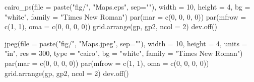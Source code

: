 \documentclass[
  letterpaper,
  DIV=11,
  numbers=noendperiod]{scrreprt}
\newenvironment{Shaded}{\begin{snugshade}}{\end{snugshade}}
\newcommand{\AttributeTok}[1]{\textcolor[rgb]{0.40,0.45,0.13}{#1}}
\newcommand{\DecValTok}[1]{\textcolor[rgb]{0.68,0.00,0.00}{#1}}
\newcommand{\FunctionTok}[1]{\textcolor[rgb]{0.28,0.35,0.67}{#1}}
\newcommand{\NormalTok}[1]{\textcolor[rgb]{0.00,0.23,0.31}{#1}}
\newcommand{\StringTok}[1]{\textcolor[rgb]{0.13,0.47,0.30}{#1}}
\begin{document}
\begin{Shaded}
\begin{Highlighting}[]
\FunctionTok{cairo\_ps}\NormalTok{(}\AttributeTok{file =} \FunctionTok{paste}\NormalTok{(}\StringTok{"fig/"}\NormalTok{, }\StringTok{"Maps.eps"}\NormalTok{, }\AttributeTok{sep=}\StringTok{""}\NormalTok{), }\AttributeTok{width =} \DecValTok{10}\NormalTok{, }\AttributeTok{height =} \DecValTok{4}\NormalTok{, }
          \AttributeTok{bg =} \StringTok{"white"}\NormalTok{, }\AttributeTok{family =} \StringTok{"Times New Roman"}\NormalTok{)}
\FunctionTok{par}\NormalTok{(}\AttributeTok{mar =} \FunctionTok{c}\NormalTok{(}\DecValTok{0}\NormalTok{, }\DecValTok{0}\NormalTok{, }\DecValTok{0}\NormalTok{, }\DecValTok{0}\NormalTok{))}
\FunctionTok{par}\NormalTok{(}\AttributeTok{mfrow =} \FunctionTok{c}\NormalTok{(}\DecValTok{1}\NormalTok{, }\DecValTok{1}\NormalTok{), }\AttributeTok{oma =} \FunctionTok{c}\NormalTok{(}\DecValTok{0}\NormalTok{, }\DecValTok{0}\NormalTok{, }\DecValTok{0}\NormalTok{, }\DecValTok{0}\NormalTok{))}
\FunctionTok{grid.arrange}\NormalTok{(gp, gp2, }\AttributeTok{ncol =} \DecValTok{2}\NormalTok{)}
\FunctionTok{dev.off}\NormalTok{()}

\FunctionTok{jpeg}\NormalTok{(}\AttributeTok{file =} \FunctionTok{paste}\NormalTok{(}\StringTok{"fig/"}\NormalTok{, }\StringTok{"Maps.jpeg"}\NormalTok{, }\AttributeTok{sep=}\StringTok{""}\NormalTok{), }\AttributeTok{width =} \DecValTok{10}\NormalTok{, }\AttributeTok{height =} \DecValTok{4}\NormalTok{, }
    \AttributeTok{units =} \StringTok{"in"}\NormalTok{, }\AttributeTok{res =} \DecValTok{300}\NormalTok{, }\AttributeTok{type =} \StringTok{"cairo"}\NormalTok{,}
          \AttributeTok{bg =} \StringTok{"white"}\NormalTok{, }\AttributeTok{family =} \StringTok{"Times New Roman"}\NormalTok{)}
\FunctionTok{par}\NormalTok{(}\AttributeTok{mar =} \FunctionTok{c}\NormalTok{(}\DecValTok{0}\NormalTok{, }\DecValTok{0}\NormalTok{, }\DecValTok{0}\NormalTok{, }\DecValTok{0}\NormalTok{))}
\FunctionTok{par}\NormalTok{(}\AttributeTok{mfrow =} \FunctionTok{c}\NormalTok{(}\DecValTok{1}\NormalTok{, }\DecValTok{1}\NormalTok{), }\AttributeTok{oma =} \FunctionTok{c}\NormalTok{(}\DecValTok{0}\NormalTok{, }\DecValTok{0}\NormalTok{, }\DecValTok{0}\NormalTok{, }\DecValTok{0}\NormalTok{))}
\FunctionTok{grid.arrange}\NormalTok{(gp, gp2, }\AttributeTok{ncol =} \DecValTok{2}\NormalTok{)}
\FunctionTok{dev.off}\NormalTok{()}
\end{Highlighting}
\end{Shaded}
\end{document}
